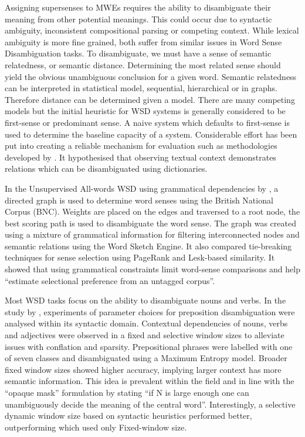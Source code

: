 Assigning supersenses to MWEs requires the ability to disambiguate their meaning from other potential meanings. This could occur due to syntactic ambiguity, inconsistent compositional parsing or competing context. While lexical ambiguity is more fine grained, both suffer from similar issues in Word Sense Disambiguation tasks. To disambiguate, we must have a sense of semantic relatedness, or semantic distance. Determining the most related sense should yield the obvious unambiguous conclusion for a given word. Semantic relatedness can be interpreted in statistical model, sequential, hierarchical or in graphs. Therefore distance can be determined given a model. There are many competing models but the initial heuristic for WSD systems is generally considered to be first-sense or predominant sense. A naive system which defaults to first-sense is used to determine the baseline capacity of a system. Considerable effort has been put into creating a reliable mechanism for evaluation such as methodologies developed by \cite{Lesk1986}. It hypothesised that observing textual context demonstrates relations which can be disambiguated using dictionaries.

In the Unsupervised All-words WSD using grammatical dependencies by \cite{Nastase2008}, a directed graph is used to determine word senses using the British National Corpus (BNC). Weights are placed on the edges and traversed to a root node, the best scoring path is used to disambiguate the word sense. The graph was created using a mixture of grammatical information for filtering interconnected nodes and semantic relations using the Word Sketch Engine\cite{Kilgarriff2014}. It also compared tie-breaking techniques for sense selection using PageRank and Lesk-based similarity. It showed that using grammatical constraints limit word-sense comparisons and help ``estimate selectional preference from an untagged corpus''\cite{Nastase2008}.

Most WSD tasks focus on the ability to disambiguate nouns and verbs. In the study by \cite{Hovy2010}, experiments of parameter choices for preposition disambiguation were analysed within its syntactic domain. Contextual dependencies of nouns, verbs and adjectives were observed in a fixed and selective window sizes to alleviate issues with conflation and sparsity. Prepositional phrases were labelled with one of seven classes and disambiguated using a Maximum Entropy model. Broader fixed window sizes showed higher accuracy, implying larger context has more semantic information. This idea is prevalent within the field and in line with the ``opaque mask'' formulation by \cite{weaver1955} stating ``if N is large enough one can unambiguously decide the meaning of the central word''. Interestingly, a selective dynamic window size based on syntactic heuristics performed better, outperforming \cite{OHara2009} which used only Fixed-window size.

